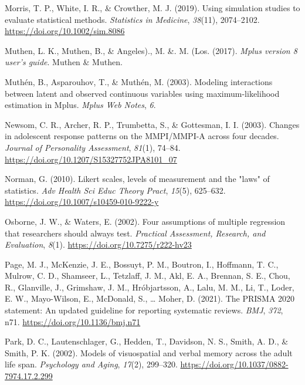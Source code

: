 \documentclass[
  man]{apa6}
\newlength{\cslhangindent}
\newlength{\cslentryspacingunit} %
\newenvironment{CSLReferences}[2] %
 {%
  \setlength{\parindent}{0pt}
  \ifodd #1
  \let\oldpar\par
  \def\par{\hangindent=\cslhangindent\oldpar}
  \fi
  \setlength{\parskip}{#2\cslentryspacingunit}
 }%
 {}
\begin{document}
\begin{CSLReferences}{1}{0}
\leavevmode{}%
Morris, T. P., White, I. R., \& Crowther, M. J. (2019). Using simulation studies to evaluate statistical methods. \emph{Statistics in Medicine}, \emph{38}(11), 2074--2102. \url{https://doi.org/10.1002/sim.8086}

\leavevmode{}%
Muthen, L. K., Muthen, B., \& Angeles)., M. \&. M. (Los. (2017). \emph{Mplus version 8 user's guide}. Muthen \& Muthen.

\leavevmode{}%
Muthén, B., Asparouhov, T., \& Muthén, M. (2003). Modeling interactions between latent and observed continuous variables using maximum-likelihood estimation in {Mplus}. \emph{Mplus Web Notes}, \emph{6}.

\leavevmode{}%
Newsom, C. R., Archer, R. P., Trumbetta, S., \& Gottesman, I. I. (2003). Changes in adolescent response patterns on the {MMPI}/{MMPI-A} across four decades. \emph{Journal of Personality Assessment}, \emph{81}(1), 74--84. \url{https://doi.org/10.1207/S15327752JPA8101_07}

\leavevmode{}%
Norman, G. (2010). Likert scales, levels of measurement and the "laws" of statistics. \emph{Adv Health Sci Educ Theory Pract}, \emph{15}(5), 625--632. \url{https://doi.org/10.1007/s10459-010-9222-y}

\leavevmode{}%
Osborne, J. W., \& Waters, E. (2002). {Four assumptions of multiple regression that researchers should always test}. \emph{Practical Assessment, Research, and Evaluation}, \emph{8}(1). \url{https://doi.org/10.7275/r222-hv23}

\leavevmode{}%
Page, M. J., McKenzie, J. E., Bossuyt, P. M., Boutron, I., Hoffmann, T. C., Mulrow, C. D., Shamseer, L., Tetzlaff, J. M., Akl, E. A., Brennan, S. E., Chou, R., Glanville, J., Grimshaw, J. M., Hróbjartsson, A., Lalu, M. M., Li, T., Loder, E. W., Mayo-Wilson, E., McDonald, S., \ldots{} Moher, D. (2021). The {PRISMA} 2020 statement: An updated guideline for reporting systematic reviews. \emph{BMJ}, \emph{372}, n71. \url{https://doi.org/10.1136/bmj.n71}

\leavevmode{}%
Park, D. C., Lautenschlager, G., Hedden, T., Davidson, N. S., Smith, A. D., \& Smith, P. K. (2002). Models of visuospatial and verbal memory across the adult life span. \emph{Psychology and Aging}, \emph{17}(2), 299--320. \url{https://doi.org/10.1037/0882-7974.17.2.299}


\end{CSLReferences}
\end{document}

